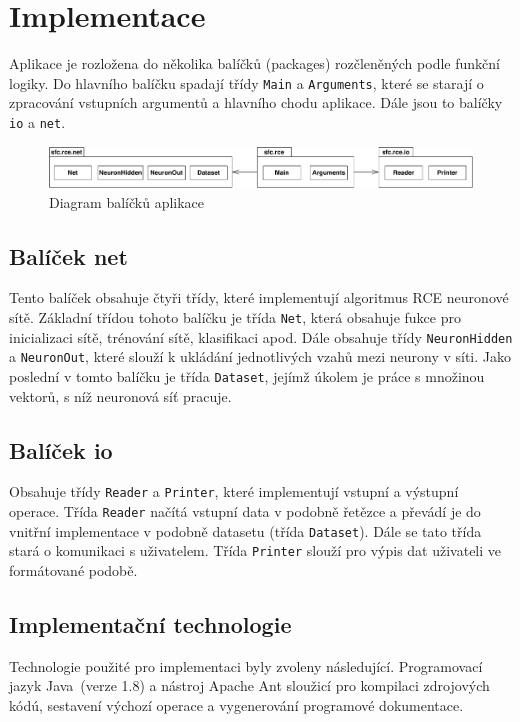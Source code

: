 \documentclass[a4paper, 11pt, titlepage]{article}
\begin{document}
\section{Implementace}
Aplikace je rozložena do několika balíčků (packages) rozčleněných podle funkční logiky. Do hlavního balíčku spadají třídy \texttt{Main} a \texttt{Arguments}, které se starají o zpracování vstupních argumentů a hlavního chodu aplikace. Dále jsou to balíčky \texttt{io} a \texttt{net}.
\begin{figure}[H]
    \centering
    \includegraphics[scale=0.5]{package_diagram_flat.pdf}
    \caption{Diagram balíčků aplikace}
    \label{fig:package_diagram}
\end{figure}
\subsection{Balíček net}
Tento balíček obsahuje čtyři třídy, které implementují algoritmus RCE neuronové sítě. Základní třídou tohoto balíčku je třída \texttt{Net}, která obsahuje fukce pro inicializaci sítě, trénování sítě, klasifikaci apod. Dále obsahuje třídy \texttt{NeuronHidden} a \texttt{NeuronOut}, které slouží k ukládání jednotlivých vzahů mezi neurony v síti. Jako poslední v tomto balíčku je třída \texttt{Dataset}, jejímž úkolem je práce s množinou vektorů, s níž neuronová síť pracuje.

\subsection{Balíček io}
Obsahuje třídy \texttt{Reader} a \texttt{Printer}, které implementují vstupní a výstupní operace. Třída \texttt{Reader} načítá vstupní data v podobně řetězce a převádí je do vnitřní implementace v podobně datasetu (třída \texttt{Dataset}). Dále se tato třída stará o komunikaci s uživatelem. Třída \texttt{Printer} slouží pro výpis dat uživateli ve formátované podobě.

\subsection{Implementační technologie}
Technologie použité pro implementaci byly zvoleny následující. Programovací jazyk Java~(verze 1.8) a nástroj Apache Ant sloužicí pro kompilaci zdrojových kódú, sestavení výchozí operace a vygenerování programové dokumentace.
\end{document}
